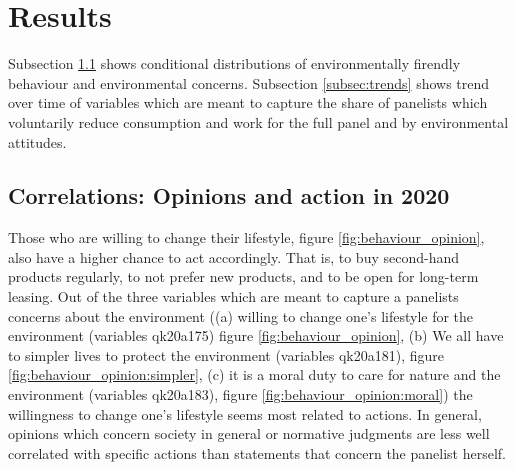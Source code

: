 \documentclass[12pt]{article}
\begin{document}
\section{Results}

Subsection \ref{subsec:heatmaps} shows conditional distributions  of environmentally firendly behaviour and environmental concerns. Subsection \ref{subsec:trends} shows trend over time of variables which are meant to capture the share of panelists which voluntarily reduce consumption and work for the full panel and by environmental attitudes. 

\subsection{Correlations: Opinions and action in 2020}\label{subsec:heatmaps}
Those who are willing to change their lifestyle, figure \ref{fig:behaviour_opinion}, also have a higher chance to act accordingly. That is, to buy second-hand products regularly, to not prefer new products, and to be open for long-term leasing. 
Out of the three variables which are meant to capture a panelists concerns about the environment ((a) willing to change one's lifestyle for the environment (variables qk20a175) figure \ref{fig:behaviour_opinion}, (b) We all have to simpler lives to protect the environment (variables qk20a181), figure \ref{fig:behaviour_opinion:simpler}, (c) it is a moral duty to care for nature and the environment (variables qk20a183), figure \ref{fig:behaviour_opinion:moral})
 the willingness to change one's lifestyle seems most related to actions. In general, opinions which concern society in general or normative judgments are less well correlated with specific actions than statements that concern the panelist herself. 
\end{document}
